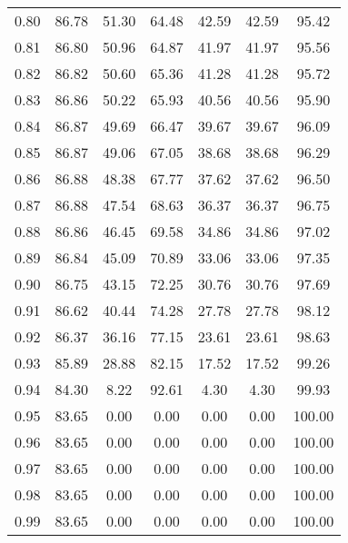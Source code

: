 \begin{tabular}{|c|c|c|c|c|c|c|}
      0.80 &     86.78 &     51.30 &      64.48 &   42.59 &      42.59 &         95.42 \\
      0.81 &     86.80 &     50.96 &      64.87 &   41.97 &      41.97 &         95.56 \\
      0.82 &     86.82 &     50.60 &      65.36 &   41.28 &      41.28 &         95.72 \\
      0.83 &     86.86 &     50.22 &      65.93 &   40.56 &      40.56 &         95.90 \\
      0.84 &     86.87 &     49.69 &      66.47 &   39.67 &      39.67 &         96.09 \\
      0.85 &     86.87 &     49.06 &      67.05 &   38.68 &      38.68 &         96.29 \\
      0.86 &     86.88 &     48.38 &      67.77 &   37.62 &      37.62 &         96.50 \\
      0.87 &     86.88 &     47.54 &      68.63 &   36.37 &      36.37 &         96.75 \\
      0.88 &     86.86 &     46.45 &      69.58 &   34.86 &      34.86 &         97.02 \\
      0.89 &     86.84 &     45.09 &      70.89 &   33.06 &      33.06 &         97.35 \\
      0.90 &     86.75 &     43.15 &      72.25 &   30.76 &      30.76 &         97.69 \\
      0.91 &     86.62 &     40.44 &      74.28 &   27.78 &      27.78 &         98.12 \\
      0.92 &     86.37 &     36.16 &      77.15 &   23.61 &      23.61 &         98.63 \\
      0.93 &     85.89 &     28.88 &      82.15 &   17.52 &      17.52 &         99.26 \\
      0.94 &     84.30 &      8.22 &      92.61 &    4.30 &       4.30 &         99.93 \\
      0.95 &     83.65 &      0.00 &       0.00 &    0.00 &       0.00 &        100.00 \\
      0.96 &     83.65 &      0.00 &       0.00 &    0.00 &       0.00 &        100.00 \\
      0.97 &     83.65 &      0.00 &       0.00 &    0.00 &       0.00 &        100.00 \\
      0.98 &     83.65 &      0.00 &       0.00 &    0.00 &       0.00 &        100.00 \\
      0.99 &     83.65 &      0.00 &       0.00 &    0.00 &       0.00 &        100.00 \\
\bottomrule
\end{tabular}

